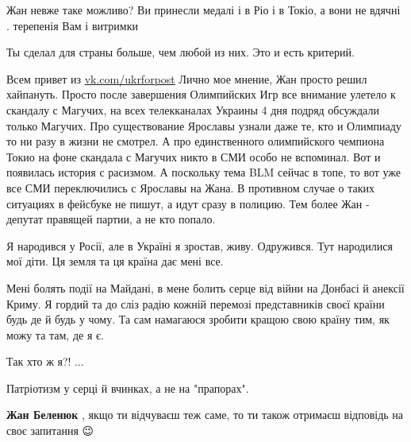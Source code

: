 \begin{itemize}
Жан невже таке можливо? Ви принесли медалі і в Ріо і в Токіо, а вони не вдячні . терепенія Вам і витримки

 
Ты сделал для страны больше, чем любой из них. Это и есть критерий.

 

Всем привет из \url{vk.com/ukrforpost} Лично мое мнение, Жан просто решил хайпануть.
Просто после завершения Олимпийских Игр все внимание улетело к скандалу с
Магучих, на всех телекканалах Украины 4 дня подряд обсуждали только Магучих.
Про существование Ярославы узнали даже те, кто и Олимпиаду то ни разу в жизни
не смотрел. А про единственного олимпийского чемпиона Токио на фоне скандала с
Магучих никто в СМИ особо не вспоминал. Вот и появилась история с расизмом. А
поскольку тема BLM сейчас в топе, то вот уже все СМИ переключились с Ярославы
на Жана. В противном случае о таких ситуациях в фейсбуке не пишут, а идут сразу
в полицию. Тем более Жан - депутат правящей партии, а не кто попало.


 

Я народився у Росії, але в Україні я зростав, живу. Одружився. Тут народилися
мої діти. Ця земля та ця країна дає мені все.

Мені болять події на Майдані, в мене болить серце від війни на Донбасі й
анексії Криму. Я гордий та до сліз радію кожній перемозі представників своєї
країни будь де й будь у чому. Та сам намагаюся зробити кращою свою країну тим,
як можу та там, де я є.

Так хто ж я?! ...

Патріотизм у серці й вчинках, а не на "прапорах".

\textbf{Жан Беленюк} , якщо ти відчуваєш теж саме, то ти також отримаєш відповідь на
своє запитання 😉


\end{itemize}
